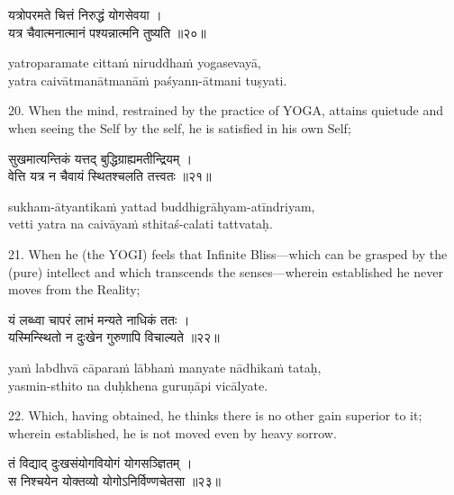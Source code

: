 \begin{gitaverse}
यत्रोपरमते चित्तं निरुद्धं योगसेवया । \\
यत्र चैवात्मनात्मानं पश्यन्नात्मनि तुष्यति ॥२०॥
\end{gitaverse}

\begin{transliteration}
yatroparamate cittaṁ niruddhaṁ yogasevayā, \\
yatra caivātmanātmanāṁ paśyann-ātmani tuṣyati.
\end{transliteration}

20. When the mind, restrained by the practice of YOGA, attains quietude and
when seeing the Self by the self, he is satisfied in his own Self;

\begin{gitaverse}
सुखमात्यन्तिकं यत्तद् बुद्धिग्राह्यमतीन्द्रियम् । \\
वेत्ति यत्र न चैवायं स्थितश्चलति तत्त्वतः ॥२१॥
\end{gitaverse}

\begin{transliteration}
sukham-ātyantikaṁ yattad buddhigrāhyam-atīndriyam, \\
vetti yatra na caivāyaṁ sthitaś-calati tattvataḥ.
\end{transliteration}

21. When he (the YOGI) feels that Infinite Bliss---which can be grasped by the
(pure) intellect and which transcends the senses---wherein established he never
moves from the Reality;

\begin{gitaverse}
यं लब्ध्वा चापरं लाभं मन्यते नाधिकं ततः । \\
यस्मिन्स्थितो न दुःखेन गुरुणापि विचाल्यते ॥२२॥
\end{gitaverse}

\begin{transliteration}
yaṁ labdhvā cāparaṁ lābhaṁ manyate nādhikaṁ tataḥ, \\
yasmin-sthito na duḥkhena guruṇāpi vicālyate.
\end{transliteration}

22. Which, having obtained, he thinks there is no other gain superior to it;
wherein established, he is not moved even by heavy sorrow.

\begin{gitaverse}
तं विद्याद् दुःखसंयोगवियोगं योगसञ्ज्ञितम् । \\
स निश्चयेन योक्तव्यो योगोऽनिर्विण्णचेतसा ॥२३॥
\end{gitaverse}

